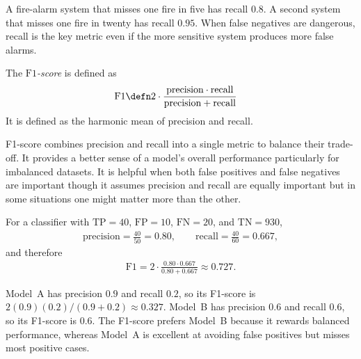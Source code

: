 \documentclass[a4paper, 12pt]{book}
\begin{document}
\begin{example}
    A fire-alarm system that misses one fire in five has recall $0.8$. A second
    system that misses one fire in twenty has recall $0.95$. When false negatives
    are dangerous, recall is the key metric even if the more sensitive system
    produces more false alarms.
\end{example}

\begin{definition}
    The \emph{$\mathrm{F1}$-score} is defined as
    \begin{align}
        \mathrm{F1} &\defn 2 \cdot \frac{\mathrm{precision} \cdot \mathrm{recall}}{\mathrm{precision} + \mathrm{recall}}
    \end{align}
    It is defined as the harmonic mean of precision and recall.
\end{definition}
F1-score combines precision and recall into a single metric to balance their trade-off. It provides a better sense of a model’s overall performance particularly for imbalanced datasets. It is helpful when both false positives and false negatives are important though it assumes precision and recall are equally important but in some situations one might matter more than the other.
\begin{example}
    For a classifier with $\mathrm{TP}=40$, $\mathrm{FP}=10$, $\mathrm{FN}=20$,
    and $\mathrm{TN}=930$,
    \begin{align}
        \mathrm{precision} = \frac{40}{50} = 0.80,
        \qquad
        \mathrm{recall} = \frac{40}{60} = 0.667,
    \end{align}
    and therefore
    \begin{align}
        \mathrm{F1}
        = 2\cdot\frac{0.80\cdot0.667}{0.80+0.667}
        \approx 0.727.
    \end{align}
\end{example}

\begin{example}
    Model~A has precision $0.9$ and recall $0.2$, so its F1-score is
    $2(0.9)(0.2)/(0.9+0.2)\approx0.327$. Model~B has precision $0.6$ and recall
    $0.6$, so its F1-score is $0.6$. The F1-score prefers Model~B because it
    rewards balanced performance, whereas Model~A is excellent at avoiding false
    positives but misses most positive cases.
\end{example}
\end{document}
